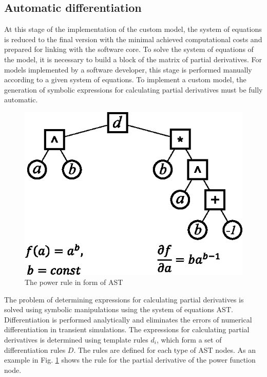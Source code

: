 \documentclass[lettersize,journal]{IEEEtran}
\begin{document}
\subsection{Automatic differentiation}

At this stage of the implementation of the custom model, the system of equations is reduced to the final version with the minimal achieved
computational costs and prepared for linking with the software core. To solve the system of equations of the model, it is necessary to build 
a block of the matrix of partial derivatives. For models implemented by a software developer, this stage is performed manually according 
to a given system of equations. To implement a custom model, the generation of symbolic expressions for calculating partial 
derivatives must be fully automatic.

\begin{figure}[h]
	\centering
	\includegraphics[width=.7\columnwidth]{derivative.eps}
	\caption{The power rule in form of AST}
	\label{fig_dpower}
\end{figure}

The problem of determining expressions for calculating partial derivatives is solved using symbolic manipulations using the system of equations AST.
Differentiation is performed analytically and eliminates the errors of numerical differentiation in transient simulations. 
The expressions for calculating partial derivatives is determined using template rules \(d_i\), which form a set of differentiation 
rules \(D\). The rules are defined for each type of AST nodes. As an example in Fig. \ref{fig_dpower} shows the rule for the partial 
derivative of the power function node.
\end{document}
